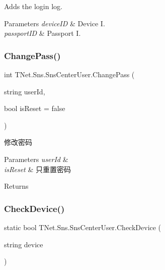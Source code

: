 Adds the login log. 


\begin{DoxyParams}{Parameters}
{\em device\+ID} & Device I.\\
\hline
{\em passport\+ID} & Passport I.\\
\hline
\end{DoxyParams}
\mbox{\label{class_t_net_1_1_sns_1_1_sns_center_user_a84d2ca90d4068a0f506758de490de577}} 
\subsubsection{\texorpdfstring{Change\+Pass()}{ChangePass()}}
{\footnotesize\ttfamily int T\+Net.\+Sns.\+Sns\+Center\+User.\+Change\+Pass (\begin{DoxyParamCaption}\item[{string}]{user\+Id,  }\item[{bool}]{is\+Reset = {\ttfamily false} }\end{DoxyParamCaption})}



修改密码 


\begin{DoxyParams}{Parameters}
{\em user\+Id} & \\
\hline
{\em is\+Reset} & 只重置密码\\
\hline
\end{DoxyParams}
\begin{DoxyReturn}{Returns}

\end{DoxyReturn}
\mbox{\label{class_t_net_1_1_sns_1_1_sns_center_user_a96b414c603449fb5c66f730429d26cf0}} 
\subsubsection{\texorpdfstring{Check\+Device()}{CheckDevice()}}
{\footnotesize\ttfamily static bool T\+Net.\+Sns.\+Sns\+Center\+User.\+Check\+Device (\begin{DoxyParamCaption}\item[{string}]{device }\end{DoxyParamCaption})\hspace{0.3cm}{\ttfamily [static]}}






